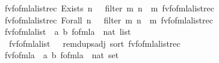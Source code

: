 \begin{isabellebody}
{\isacharbar}{\kern0pt}\ {\isachardoublequoteopen}fv{\isacharunderscore}{\kern0pt}fo{\isacharunderscore}{\kern0pt}fmla{\isacharunderscore}{\kern0pt}list{\isacharunderscore}{\kern0pt}rec\ {\isacharparenleft}{\kern0pt}Exists\ n\ {\isasymphi}{\isacharparenright}{\kern0pt}\ {\isacharequal}{\kern0pt}\ filter\ {\isacharparenleft}{\kern0pt}{\isasymlambda}m{\isachardot}{\kern0pt}\ n\ {\isasymnoteq}\ m{\isacharparenright}{\kern0pt}\ {\isacharparenleft}{\kern0pt}fv{\isacharunderscore}{\kern0pt}fo{\isacharunderscore}{\kern0pt}fmla{\isacharunderscore}{\kern0pt}list{\isacharunderscore}{\kern0pt}rec\ {\isasymphi}{\isacharparenright}{\kern0pt}{\isachardoublequoteclose}\isanewline
{\isacharbar}{\kern0pt}\ {\isachardoublequoteopen}fv{\isacharunderscore}{\kern0pt}fo{\isacharunderscore}{\kern0pt}fmla{\isacharunderscore}{\kern0pt}list{\isacharunderscore}{\kern0pt}rec\ {\isacharparenleft}{\kern0pt}Forall\ n\ {\isasymphi}{\isacharparenright}{\kern0pt}\ {\isacharequal}{\kern0pt}\ filter\ {\isacharparenleft}{\kern0pt}{\isasymlambda}m{\isachardot}{\kern0pt}\ n\ {\isasymnoteq}\ m{\isacharparenright}{\kern0pt}\ {\isacharparenleft}{\kern0pt}fv{\isacharunderscore}{\kern0pt}fo{\isacharunderscore}{\kern0pt}fmla{\isacharunderscore}{\kern0pt}list{\isacharunderscore}{\kern0pt}rec\ {\isasymphi}{\isacharparenright}{\kern0pt}{\isachardoublequoteclose}\isanewline
\isanewline
{}\isamarkupfalse%
\ fv{\isacharunderscore}{\kern0pt}fo{\isacharunderscore}{\kern0pt}fmla{\isacharunderscore}{\kern0pt}list\ {\isacharcolon}{\kern0pt}{\isacharcolon}{\kern0pt}\ {\isachardoublequoteopen}{\isacharparenleft}{\kern0pt}{\isacharprime}{\kern0pt}a{\isacharcomma}{\kern0pt}\ {\isacharprime}{\kern0pt}b{\isacharparenright}{\kern0pt}\ fo{\isacharunderscore}{\kern0pt}fmla\ {\isasymRightarrow}\ nat\ list{\isachardoublequoteclose}\ \isanewline
\ \ {\isachardoublequoteopen}fv{\isacharunderscore}{\kern0pt}fo{\isacharunderscore}{\kern0pt}fmla{\isacharunderscore}{\kern0pt}list\ {\isasymphi}\ {\isacharequal}{\kern0pt}\ remdups{\isacharunderscore}{\kern0pt}adj\ {\isacharparenleft}{\kern0pt}sort\ {\isacharparenleft}{\kern0pt}fv{\isacharunderscore}{\kern0pt}fo{\isacharunderscore}{\kern0pt}fmla{\isacharunderscore}{\kern0pt}list{\isacharunderscore}{\kern0pt}rec\ {\isasymphi}{\isacharparenright}{\kern0pt}{\isacharparenright}{\kern0pt}{\isachardoublequoteclose}\isanewline
\isanewline
{}\isamarkupfalse%
\ fv{\isacharunderscore}{\kern0pt}fo{\isacharunderscore}{\kern0pt}fmla\ {\isacharcolon}{\kern0pt}{\isacharcolon}{\kern0pt}\ {\isachardoublequoteopen}{\isacharparenleft}{\kern0pt}{\isacharprime}{\kern0pt}a{\isacharcomma}{\kern0pt}\ {\isacharprime}{\kern0pt}b{\isacharparenright}{\kern0pt}\ fo{\isacharunderscore}{\kern0pt}fmla\ {\isasymRightarrow}\ nat\ set{\isachardoublequoteclose}\ \isanewline

\end{isabellebody}

